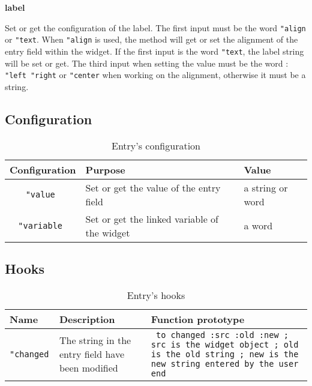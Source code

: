 {\bf label} 
Set or get the configuration of the label. The first input must be the word {\tt "align} or {\tt "text}. When {\tt "align} is used, the method will get or set the alignment of the entry field within the widget. If the first input is the word {\tt "text}, the label string will be set or get. The third input when setting the value must be the word : {\tt "left "right} or {\tt "center} when working on the alignment, otherwise it must be a string.

\subsection{Configuration}

\begin{table}[ht]
\centering
\begin{tabular}{|c|p{5cm}|p{5cm}|}
\hline
\bf Configuration & \bf Purpose & \bf Value \\
\hline
\tt "value\index{Entry@\textbf{Entry}!Configuration!value} & Set or get the value of the entry field & a string or word\\
\hline
\tt "variable\index{Entry@\textbf{Entry}!Configuration!variable} & Set or get the linked variable of the widget & a word\\
\hline
\end{tabular}
\caption{Entry's configuration}
\end{table}

\newpage

\subsection{Hooks}

\begin{table}[h!]
\centering
\begin{tabular}{|l|p{3cm}|p{8.5cm}|}
\hline
\bf Name & \bf Description & \bf Function prototype \\
\hline
\tt "changed\index{Entry@\textbf{Entry}!Hooks!changed} & The string in the entry field have been modified & {\tt
to changed :src :old :new\newline
; src is the widget object\newline
; old is the old string\newline
; new is the new string entered by the user\newline
end
}\\
\hline
\end{tabular}
\caption{Entry's hooks}
\end{table}

